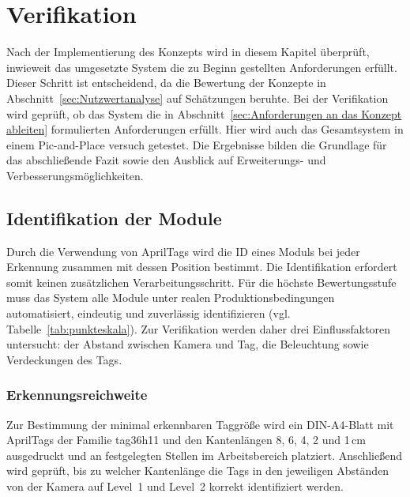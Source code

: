 \cleardoublepage
\chapter{Verifikation}
\label{ch:Verifikation}

Nach der Implementierung des Konzepts wird in diesem Kapitel überprüft, inwieweit das umgesetzte System die zu Beginn gestellten Anforderungen erfüllt. Dieser Schritt ist entscheidend, da die Bewertung der Konzepte in Abschnitt~\ref{sec:Nutzwertanalyse} auf Schätzungen beruhte. Bei der Verifikation wird geprüft, ob das System die in Abschnitt~\ref{sec:Anforderungen an das Konzept ableiten} formulierten Anforderungen erfüllt. Hier wird auch das Gesamtsystem in einem Pic-and-Place versuch getestet. Die Ergebnisse bilden die Grundlage für das abschließende Fazit sowie den Ausblick auf Erweiterungs- und Verbesserungsmöglichkeiten. 


\section{Identifikation der Module}
\label{sec:Identifikation der Module_Verifikation}

Durch die Verwendung von AprilTags wird die ID eines Moduls bei jeder Erkennung zusammen mit dessen Position bestimmt. Die Identifikation erfordert somit keinen zusätzlichen Verarbeitungsschritt. Für die höchste Bewertungsstufe muss das System alle Module unter realen Produktionsbedingungen automatisiert, eindeutig und zuverlässig identifizieren (vgl. Tabelle~\ref{tab:punkteskala}). Zur Verifikation werden daher drei Einflussfaktoren untersucht: der Abstand zwischen Kamera und Tag, die Beleuchtung sowie Verdeckungen des Tags.

\subsection{Erkennungsreichweite}

Zur Bestimmung der minimal erkennbaren Taggröße wird ein DIN-A4-Blatt mit AprilTags der Familie tag36h11 und den Kantenlängen 8, 6, 4, 2 und 1\,cm ausgedruckt und an festgelegten Stellen im Arbeitsbereich platziert. Anschließend wird geprüft, bis zu welcher Kantenlänge die Tags in den jeweiligen Abständen von der Kamera auf Level~1 und Level~2 korrekt identifiziert werden.

